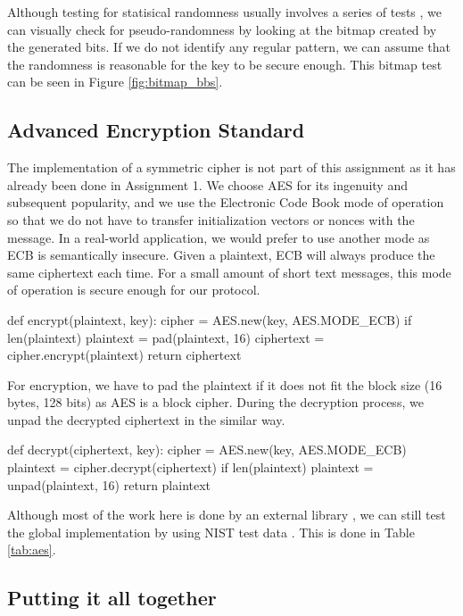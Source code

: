 \documentclass{article}
\begin{document}
Although testing for statisical randomness usually involves a series of tests \cite{rukhin2001statistical}, we can visually check for pseudo-randomness by looking at the bitmap created by the generated bits. If we do not identify any regular pattern, we can assume that the randomness is reasonable for the key to be secure enough. This bitmap test can be seen in Figure \ref{fig:bitmap_bbs}.

\subsection{Advanced Encryption Standard}

The implementation of a symmetric cipher is not part of this assignment as it has already been done in Assignment 1. We choose AES for its ingenuity and subsequent popularity, and we use the Electronic Code Book mode of operation so that we do not have to transfer initialization vectors or nonces with the message. In a real-world application, we would prefer to use another mode as ECB is semantically insecure. Given a plaintext, ECB will always produce the same ciphertext each time. For a small amount of short text messages, this mode of operation is secure enough for our protocol.
  
\bigskip
\begin{python}
def encrypt(plaintext, key):
    cipher = AES.new(key, AES.MODE_ECB)
    if len(plaintext) %
        plaintext = pad(plaintext, 16)
    ciphertext = cipher.encrypt(plaintext)
    return ciphertext
\end{python}
\bigskip

For encryption, we have to pad the plaintext if it does not fit the block size (16 bytes, 128 bits) as AES is a block cipher. During the decryption process, we unpad the decrypted ciphertext in the similar way. 

\bigskip
\begin{python}
def decrypt(ciphertext, key):
    cipher = AES.new(key, AES.MODE_ECB)
    plaintext = cipher.decrypt(ciphertext)
    if len(plaintext) %
        plaintext = unpad(plaintext, 16)
    return plaintext
\end{python}
\bigskip

Although most of the work here is done by an external library \cite{pycryptodome}, we can still test the global implementation by using NIST test data \cite{nist:test}. This is done in Table \ref{tab:aes}.

\subsection{Putting it all together}
\end{document}

